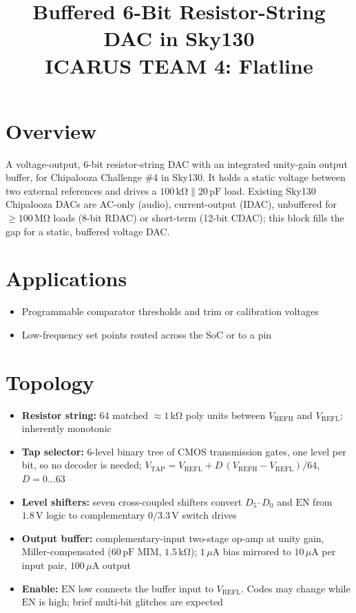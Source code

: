 \documentclass[10pt,a4paper]{article}
\title{\textbf{Buffered 6-Bit Resistor-String DAC in Sky130} \\ \large ICARUS TEAM 4: Flatline}
\author{}
\date{}
\newcommand{\vrefh}{\ensuremath{V_{\mathrm{REFH}}}}
\newcommand{\vrefl}{\ensuremath{V_{\mathrm{REFL}}}}
\newcommand{\vtap}{\ensuremath{V_{\mathrm{TAP}}}}
\newcommand{\en}{\ensuremath{\mathrm{EN}}}
\newcommand{\dbus}{\ensuremath{D_5\text{--}D_0}}
\begin{document}
\maketitle

\section{Overview}
A voltage-output, 6-bit resistor-string DAC with an integrated unity-gain output buffer, for Chipalooza Challenge \#4 in Sky130. It holds a static voltage between two external references and drives a $100\,\mathrm{k\Omega} \parallel 20\,\mathrm{pF}$ load. Existing Sky130 Chipalooza DACs are AC-only (audio), current-output (IDAC), unbuffered for $\geq 100\,\mathrm{M\Omega}$ loads (8-bit RDAC) or short-term (12-bit CDAC); this block fills the gap for a static, buffered voltage DAC.

\section{Applications}
\begin{itemize}
    \item Programmable comparator thresholds and trim or calibration voltages
    \item Low-frequency set points routed across the SoC or to a pin
\end{itemize}

\section{Topology}
\begin{itemize}
    \item \textbf{Resistor string:} 64 matched $\approx 1\,\mathrm{k\Omega}$ poly units between \vrefh{} and \vrefl{}; inherently monotonic
    \item \textbf{Tap selector:} 6-level binary tree of CMOS transmission gates, one level per bit, so no decoder is needed; $\vtap = \vrefl + D\,(\vrefh - \vrefl)/64$, $D = 0\ldots63$
    \item \textbf{Level shifters:} seven cross-coupled shifters convert \dbus{} and \en{} from $1.8\,\mathrm{V}$ logic to complementary $0/3.3\,\mathrm{V}$ switch drives
    \item \textbf{Output buffer:} complementary-input two-stage op-amp at unity gain, Miller-compensated ($60\,\mathrm{pF}$ MIM, $1.5\,\mathrm{k\Omega}$); $1\,\mu\mathrm{A}$ bias mirrored to $10\,\mu\mathrm{A}$ per input pair, $100\,\mu\mathrm{A}$ output
    \item \textbf{Enable:} \en{} low connects the buffer input to \vrefl{}. Codes may change while \en{} is high; brief multi-bit glitches are expected
\end{itemize}
\end{document}
